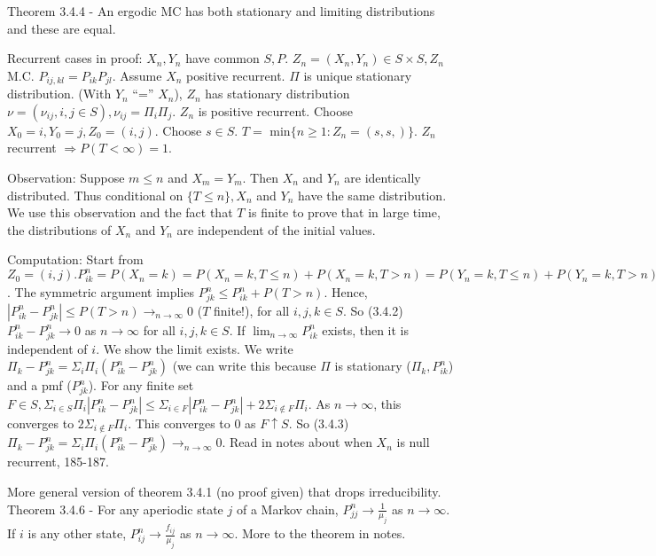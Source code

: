 \documentclass{article}
\begin{document}
Theorem 3.4.4 - An ergodic MC has both stationary and limiting distributions and these are equal.

Recurrent cases in proof: $X_n, Y_n$ have common $S, P$. $Z_n = (X_n, Y_n) \in S \times S, Z_n$ M.C. $P_{ij, kl} = P_{ik} P_{jl}$. Assume $X_n$ positive recurrent. $\Pi$ is unique stationary distribution. (With $Y_n$ ``='' $X_n$), $Z_n$ has stationary distribution $\nu = (\nu_{ij}, i, j \in S), \nu_{ij} = \Pi_i \Pi_j$. $Z_n$ is positive recurrent. Choose $X_0 = i, Y_0 = j, Z_0 = (i, j)$. Choose $s \in S$. $T =$ min$\{n \ge 1: Z_n = (s, s,)\}$. $Z_n$ recurrent $\Rightarrow P(T < \infty) = 1$.

Observation: Suppose $m \le n$ and $X_m = Y_m$. Then $X_n$ and $Y_n$ are identically distributed. Thus conditional on $\{T \le n\}, X_n$ and $Y_n$ have the same distribution. We use this observation and the fact that $T$ is finite to prove that in large time, the distributions of $X_n$ and $Y_n$ are independent of the initial values.

Computation: Start from $Z_0 = (i, j). P_{ik}^n = P(X_n=k) = P(X_n = k, T \le n) + P(X_n = k, T > n) = P(Y_n = k, T \le n) + P(Y_n = k, T > n) \le P(Y_n = k) + P(T > n) = P_{jk}^n + P(T > n)$. The symmetric argument implies $P_{jk}^n \le P_{ik}^n + P(T > n)$. Hence, $|P_{ik}^n - P_{jk}^n| \le P(T > n) \rightarrow_{n \rightarrow \infty} 0$ ($T$ finite!), for all $i, j, k \in S$. So (3.4.2) $P_{ik}^n - P_{jk}^n \rightarrow 0$ as $n \rightarrow \infty$ for all $i, j, k \in S$. If $\lim_{n \rightarrow \infty} P_{ik}^n$ exists, then it is independent of $i$. We show the limit exists. We write $\Pi_k - P_{jk}^n = \Sigma_i \Pi_i (P_{ik}^n - P_{jk}^n)$ (we can write this because $\Pi$ is stationary ($\Pi_k, P_{ik}^n$) and a pmf ($P_{jk}^n$). For any finite set $F \in S, \Sigma_{i \in S} \Pi_i |P_{ik}^n - P_{jk}^n| \le \Sigma_{i \in F} |P_{ik}^n - P_{jk}^n| + 2 \Sigma_{i \not \in F} \Pi_i$. As $n \rightarrow \infty$, this converges to $2 \Sigma_{i \not \in F} \Pi_i$. This converges to 0 as $F \uparrow S$. So (3.4.3) $\Pi_k - P_{jk}^n = \Sigma_i \Pi_i (P_{ik}^n - P_{jk}^n) \rightarrow_{n \rightarrow \infty} 0$. Read in notes about when $X_n$ is null recurrent, 185-187.

More general version of theorem 3.4.1 (no proof given) that drops irreducibility. Theorem 3.4.6 - For any aperiodic state $j$ of a Markov chain, $P_{jj}^n \rightarrow \frac{1}{\mu_j}$ as $n \rightarrow \infty$. If $i$ is any other state, $P_{ij}^n \rightarrow \frac{f_{ij}}{\mu_j}$ as $n \rightarrow \infty$. More to the theorem in notes.
\end{document}

